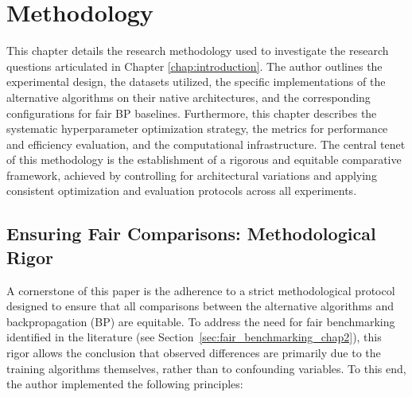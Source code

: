 \section{Methodology}
\label{chap:methodology}

This chapter details the research methodology used to investigate the research questions articulated in Chapter \ref{chap:introduction}. The author outlines the experimental design, the datasets utilized, the specific implementations of the alternative algorithms on their native architectures, and the corresponding configurations for fair BP baselines. Furthermore, this chapter describes the systematic hyperparameter optimization strategy, the metrics for performance and efficiency evaluation, and the computational infrastructure. The central tenet of this methodology is the establishment of a rigorous and equitable comparative framework, achieved by controlling for architectural variations and applying consistent optimization and evaluation protocols across all experiments.

\subsection{Ensuring Fair Comparisons: Methodological Rigor}
\label{sec:methodology_fairness_rigor}

A cornerstone of this paper is the adherence to a strict methodological protocol designed to ensure that all comparisons between the alternative algorithms and backpropagation (BP) are equitable. To address the need for fair benchmarking identified in the literature (see Section~\ref{sec:fair_benchmarking_chap2}), this rigor allows the conclusion that observed differences are primarily due to the training algorithms themselves, rather than to confounding variables. To this end, the author implemented the following principles:

